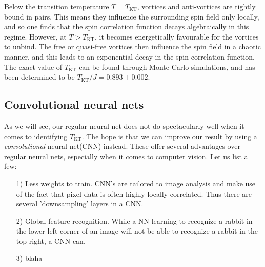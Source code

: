 \documentclass[]{article}
\begin{document}
Below the transition temperature $T = T_\text{KT}$, vortices and anti-vortices are tightly bound in pairs. This means they influence the surrounding spin field only locally, and so one finds that the spin correlation function decays algebraically in this regime. However, at $T > T_\text{KT}$, it becomes energetically favourable for the vortices to unbind. The free or quasi-free vortices then influence the spin field in a chaotic manner, and this leads to an exponential decay in the spin correlation function. The exact value of $T_\text{KT}$ can be found through Monte-Carlo simulations, and has been determined to be $T_\text{KT}/J = 0.893 \pm 0.002$.\cite{Olsson_1991}

\subsection{Convolutional neural nets}
As we will see, our regular neural net does not do spectacularly well when it comes to identifying $T_\text{KT}$. The hope is that we can improve our result by using a \textit{convolutional} neural net(CNN) instead. These offer several advantages over regular neural nets, especially when it comes to computer vision. Let us list a few:

\begin{itemize}
	\item[1)] Less weights to train. CNN's are tailored to image analysis and make use of the fact that pixel data is often highly locally correlated. Thus there are several 'downsampling' layers in a CNN.
	\item[2)] Global feature recognition. While a NN learning to recognize a rabbit in the lower left corner of an image will not be able to recognize a rabbit in the top right, a CNN can.
	\item[3)] blaha
\end{itemize}
\end{document}
